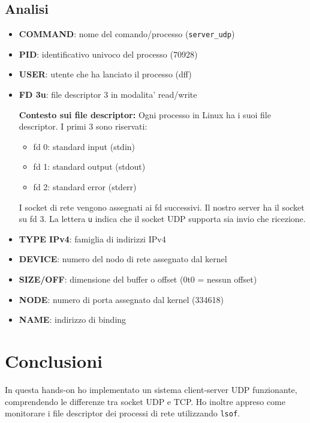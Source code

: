 \documentclass[a4paper,12pt]{article}
\begin{document}
\subsection{Analisi}
\begin{itemize}
    \item \textbf{COMMAND}: nome del comando/processo (\texttt{server\_udp})
    \item \textbf{PID}: identificativo univoco del processo (70928)
    \item \textbf{USER}: utente che ha lanciato il processo (dff)
    \item \textbf{FD 3u}: file descriptor 3 in modalita' read/write

    \textbf{Contesto sui file descriptor:}
    Ogni processo in Linux ha i suoi file descriptor. I primi 3 sono riservati:
    \begin{itemize}
        \item fd 0: standard input (stdin)
        \item fd 1: standard output (stdout)
        \item fd 2: standard error (stderr)
    \end{itemize}
    I socket di rete vengono assegnati ai fd successivi. Il nostro server ha il socket su fd 3. La lettera \texttt{u} indica che il socket UDP supporta sia invio che ricezione.

    \item \textbf{TYPE IPv4}: famiglia di indirizzi IPv4
    \item \textbf{DEVICE}: numero del nodo di rete assegnato dal kernel
    \item \textbf{SIZE/OFF}: dimensione del buffer o offset (0t0 = nessun offset)
    \item \textbf{NODE}: numero di porta assegnato dal kernel (334618)
    \item \textbf{NAME}: indirizzo di binding
\end{itemize}

\section{Conclusioni}
In questa hands-on ho implementato un sistema client-server UDP funzionante,
comprendendo le differenze tra socket UDP e TCP. Ho inoltre appreso come
monitorare i file descriptor dei processi di rete utilizzando \texttt{lsof}.
\end{document}
